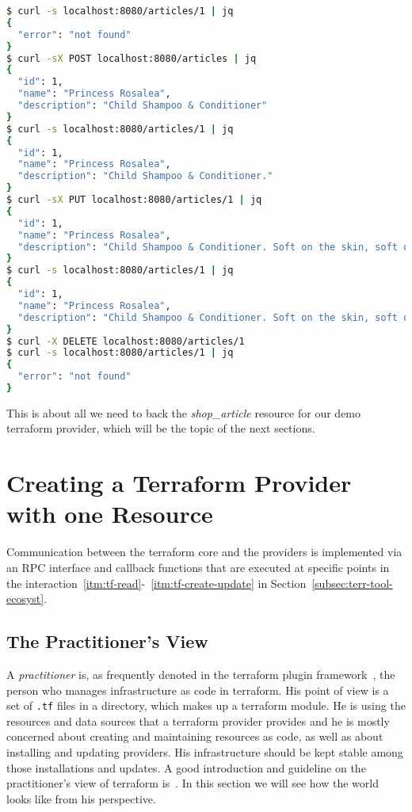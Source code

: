 \documentclass[paper=a4,11pt,numbers=noenddot]{article}
\begin{document}
\begin{lstlisting}[language=bash]
$ curl -s localhost:8080/articles/1 | jq
{
  "error": "not found"
}
$ curl -sX POST localhost:8080/articles | jq
{
  "id": 1,
  "name": "Princess Rosalea",
  "description": "Child Shampoo & Conditioner"
}
$ curl -s localhost:8080/articles/1 | jq
{
  "id": 1,
  "name": "Princess Rosalea",
  "description": "Child Shampoo & Conditioner."
}
$ curl -sX PUT localhost:8080/articles/1 | jq
{
  "id": 1,
  "name": "Princess Rosalea",
  "description": "Child Shampoo & Conditioner. Soft on the skin, soft on the environment."
}
$ curl -s localhost:8080/articles/1 | jq
{
  "id": 1,
  "name": "Princess Rosalea",
  "description": "Child Shampoo & Conditioner. Soft on the skin, soft on the environment."
}
$ curl -X DELETE localhost:8080/articles/1
$ curl -s localhost:8080/articles/1 | jq
{
  "error": "not found"
}
\end{lstlisting}

This is about all we need to back the \emph{shop\_article} resource for our demo terraform provider, which will be the topic of the next sections.

\section{Creating a Terraform Provider with one Resource}
\label{sec:creat-terr-prov}

Communication between the terraform core and the providers is implemented via an RPC interface and callback functions that are executed at specific points in the interaction~\ref{itm:tf-read}-~\ref{itm:tf-create-update} in Section~\ref{subsec:terr-tool-ecosyst}.

\subsection{The Practitioner's View}
\label{subsec:practitioners-view}

A \emph{practitioner} is, as frequently denoted in the terraform plugin framework~\autocite{noauthor_terraform_framework_nodate}, the person who manages infrastructure as code in terraform. His point of view is a set of \verb'.tf' files in a directory, which makes up a terraform module. He is using the resources and data sources that a terraform provider provides and he is mostly concerned about creating and maintaining resources as code, as well as about installing and updating providers. His infrastructure should be kept stable among those installations and updates. A good introduction and guideline on the practitioner's view of terraform is~\autocite{brikman_terraform_2022}. In this section we will see how the world looks like from his perspective.
\end{document}
